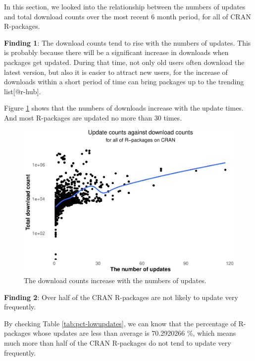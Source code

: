 \documentclass[
]{book}
\newenvironment{discovery}[1]{%
  \begin{tcolorbox}[colback=blue!30,colframe=blue!80!black]#1}{\end{tcolorbox}}
\begin{document}
In this section, we looked into the relationship between the numbers of updates and total download counts over the most recent 6 month period, for all of CRAN R-packages.

\begin{discovery}
\textbf{Finding 1}: The download counts tend to rise with the numbers of
updates. This is probably because there will be a significant increase
in downloads when packages get updated. During that time, not only old
users often download the latest version, but also it is easier to
attract new users, for the increase of downloads within a short period
of time can bring packages up to the trending list{[}@r-hub{]}.
\end{discovery}

Figure \ref{fig:all-updates} shows that the numbers of downloads increase with the update times. And most R-packages are updated no more than 30 times.



\begin{figure}

{\centering \includegraphics{figures/all-updates-1} 

}

\caption{The download counts increase with the numbers of updates.}\label{fig:all-updates}
\end{figure}

\begin{discovery}
\textbf{Finding 2}: Over half of the CRAN R-packages are not likely to
update very frequently.
\end{discovery}

By checking Table \ref{tab:pct-lowupdates}, we can know that the percentage of R-packages whose updates are less than average is 70.2920266 \%, which means much more than half of the CRAN R-packages do not tend to update very frequently.
\end{document}

